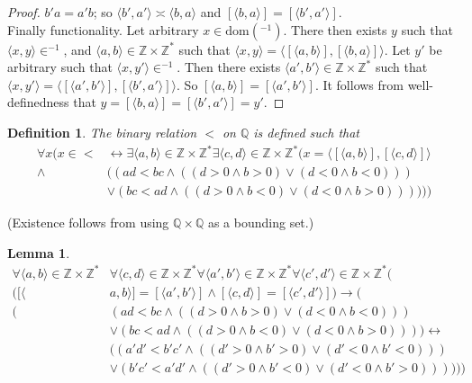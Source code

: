 \documentclass{report}
\newtheorem{lemma}[theo]{Lemma}
\newtheorem{definition}[theo]{Definition}
\begin{document}
\begin{proof}
$b'a=a'b$; so $\langle b',a'\rangle\asymp\langle b,a\rangle$ and 
$[\langle b,a\rangle]=[\langle b',a'\rangle]$.\\
\indent Finally functionality. Let arbitrary $x\in\text{dom}(^{-1})$. There then exists $y$ such that $\langle x,y\rangle\in^{-1}$, and $\langle a,b\rangle\in\mathbb Z\times\mathbb Z^*$ such that 
$\langle x,y\rangle=\langle[\langle a,b\rangle],[\langle b,a\rangle]\rangle$. Let $y'$ be arbitrary such that $\langle x,y'\rangle\in^{-1}$. 
Then there exists $\langle a',b'\rangle\in\mathbb Z\times\mathbb Z^*$ such that 
$\langle x,y'\rangle=\langle[\langle a',b'\rangle],[\langle b',a'\rangle]\rangle$. So $[\langle a,b\rangle]=[\langle a',b'\rangle]$. 
It follows from well-definedness that $y=[\langle b,a\rangle]=[\langle b',a'\rangle]=y'$.
\end{proof}
\begin{definition}
The binary relation $<$ on $\mathbb Q$ is defined such that
\begin{align*}
\forall x(x\in<&\leftrightarrow\exists\langle a,b\rangle\in\mathbb Z\times\mathbb Z^*
\exists\langle c,d\rangle\in\mathbb Z\times\mathbb Z^*(x=\langle[\langle a,b\rangle],[\langle c,d\rangle]\rangle\\
\land&((ad<bc\land((d>0\land b>0)\lor(d<0\land b<0)))\\
&\lor(bc<ad\land((d>0\land b<0)\lor(d<0\land b>0))))))
\end{align*}
\end{definition}
\noindent(Existence follows from using $\mathbb Q\times\mathbb Q$ as a bounding set.)
\begin{lemma}\label{Q_strict_order_lemma_1}
\begin{align*}
\forall\langle a,b\rangle\in\mathbb Z\times\mathbb Z^*&\forall\langle c,d\rangle\in\mathbb Z\times\mathbb Z^*
\forall\langle a',b'\rangle\in\mathbb Z\times\mathbb Z^*\forall\langle c',d'\rangle\in\mathbb Z\times\mathbb Z^*(\\
([\langle&a,b\rangle]=[\langle a',b'\rangle]\land
[\langle c,d\rangle]=[\langle c',d'\rangle])\to(\\
(&(ad<bc\land((d>0\land b>0)\lor(d<0\land b<0)))\\
&\lor(bc<ad\land((d>0\land b<0)\lor(d<0\land b>0))))\leftrightarrow\\
&((a'd'<b'c'\land((d'>0\land b'>0)\lor(d'<0\land b'<0)))\\
&\lor(b'c'<a'd'\land((d'>0\land b'<0)\lor(d'<0\land b'>0))))))
\end{align*}
\end{lemma}
\end{document}
